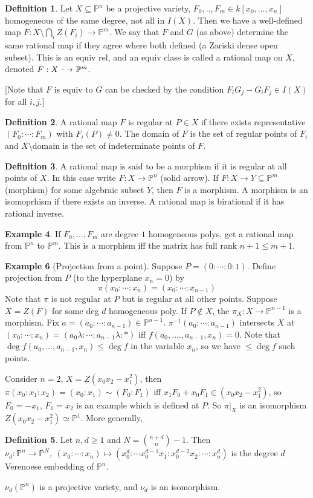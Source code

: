 \documentclass{article}
\theoremstyle{definition}
\newtheorem{defn}{Definition}[section]
\newtheorem{example}[defn]{Example}
\theoremstyle{remark}
\theoremstyle{plain}
\newcommand{\PP}{\mathbb{P}}
\newcommand\dashto{\mathrel{
  -\mkern-6mu{\to}\mkern-20mu{\color{white}\bullet}\mkern12mu
}}
\begin{document}
\begin{defn}
    Let $X\subseteq\PP^n$ be a projective variety, $F_0,..,F_m\in k[x_0,...,x_n]$ homogeneous of the same degree, not all in $I(X)$. Then we have a well-defined map $F:X\setminus\bigcap_iZ(F_i)\to\PP^m$. We say that $F$ and $G$ (as above) determine the same rational map if they agree where both defined (a Zariski dense open subset). This is an equiv rel, and an equiv class is called a rational map on $X$, denoted $F:X\dashto\PP^m$.
\end{defn}
[Note that $F$ is equiv to $G$ can be checked by the condition $F_iG_j-G_iF_j\in I(X)$ for all $i,j$.]
\begin{defn}
    A rational map $F$ is regular at $P\in X$ if there exists representative $(F_0:\cdots:F_m)$ with $F_i(P)\neq 0$. The domain of $F$ is the set of regular points of $F_i$ and $X\setminus\text{domain}$ is the set of indeterminate points of $F$.
\end{defn}
\begin{defn}
    A rational map is said to be a morphism if it is regular at all points of $X$. In this case write $F:X\to \PP^n$ (solid arrow). If $F:X\to Y\subseteq\PP^m$ (morphism) for some algebraic subset $Y$, then $F$ is a morphism. A morphism is an isomoprhism if there exists an inverse. A rational map is birational if it has rational inverse.
\end{defn}
\begin{example}
    If $F_0,...,F_m$ are degree $1$ homogeneous polys, get a rational map from $\PP^n$ to $\PP^m$. This is a morphism iff the matrix has full rank $n+1\le m+1$.
\end{example}
\begin{example}[Projection from a point]
    Suppose $P=(0:\cdots:0:1)$. Define projection from $P$ (to the hyperplane $x_n=0$) by
    \[\pi(x_0:\cdots:x_n)=(x_0:\cdots:x_{n-1})\]
    Note that $\pi$ is not regular at $P$ but is regular at all other points. Suppose $X=Z(F)$ for some deg $d$ homogeneous poly. If $P\notin X$, the $\pi_X:X\to\PP^{n-1}$ is a morphism. Fix $a=(a_0:\cdots:a_{n-1})\in\PP^{n-1}$. $\pi^{-1}(a_0:\cdots:a_{n-1})$  intersects $X$ at $(x_0:\cdots:x_n)=(a_0\lambda:\cdots:a_{n-1}\lambda:\ast)$ iff $f(a_0,....,a_{n-1},x_n)=0$. Note that $\deg f(a_0,...,a_{n-1},x_n)\le \deg f$ in the variable $x_n$, so we have $\le\deg f$ such points.

    Consider $n=2$, $X=Z(x_0x_2-x_1^2)$, then $\pi(x_0:x_1:x_2)=(x_0:x_1)\sim(F_0:F_1)$ iff $x_1F_0+x_0F_1\in(x_0x_2-x_1^2)$, so $F_0=-x_1$, $F_1=x_2$ is an example which is defined at $P$. So $\pi|_{X}$ is an isomorphism $Z(x_0x_2-x_1^2)\simeq\PP^1$. More generally,
    \begin{defn}
        Let $n,d\ge 1$ and $N=\binom{n+d}{n}-1$. Then $\nu_d:\PP^n\to\PP^N,\ (x_0:\cdots:x_n)\mapsto (x_0^d:\cdots x_0^{d-1}x_1:x_0^{d-2}x_2:\cdots:x_n^d)$ is the degree $d$ Verenoese embedding of $\PP^n$.
    \end{defn}
    $\nu_d(\PP^n)$ is a projective variety, and $\nu_d$ is an isomorphism.
\end{example}
\end{document}
